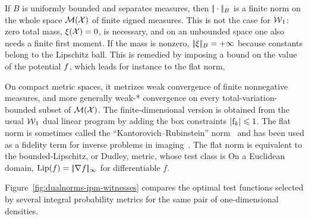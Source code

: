 \begin{example}
If $B$ is uniformly bounded and separates measures, then $|\!| \cdot |\!|_B$ is a finite norm on the whole space $\mathcal{M}(\mathcal{X})$ of finite signed measures.
%
This is not the case for $\operatorname{\mathcal{W}}_1$: zero total mass, $\xi(\mathcal{X})=0$, is necessary, and on an unbounded space one also needs a finite first moment. If the mass is nonzero, $|\!| \xi |\!|_B=+\infty$ because constants belong to the Lipschitz ball.
%
This is remedied by imposing a bound on the value of the potential $f$, which leads for instance to the flat norm,

On compact metric spaces, it metrizes weak convergence of finite nonnegative measures, and more generally weak-* convergence on every total-variation-bounded subset of $\mathcal{M}(\mathcal{X})$.
%
The finite-dimensional version is obtained from the usual $\operatorname{\mathcal{W}}_1$ dual linear program by adding the box constraints $\left\lvert\mathrm{f}_k\right\rvert\leqslant1$.
%
The flat norm is sometimes called the ``Kantorovich--Rubinstein'' norm~\cite{hanin1992kantorovich} and has been used as a fidelity term for inverse problems in imaging~\cite{lellmann2014imaging}.
%
The flat norm is equivalent to the bounded-Lipschitz, or Dudley, metric, whose test class is
On a Euclidean domain, $\operatorname{Lip}(f)=|\!| \nabla f |\!|_\infty$ for differentiable $f$.
\end{example}

Figure~\ref{fig:dualnorms-ipm-witnesses} compares the optimal test functions selected by several integral probability metrics for the same pair of one-dimensional densities.

